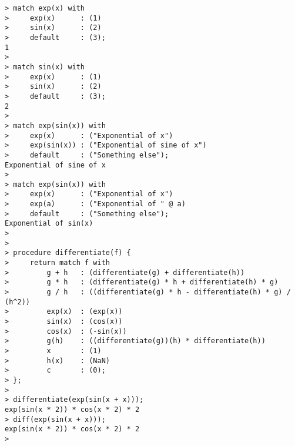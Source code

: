 \begin{center}\begin{minipage}{15cm}\begin{Verbatim}[frame=single]
> match exp(x) with 
>     exp(x)      : (1) 
>     sin(x)      : (2)
>     default     : (3);
1
> 
> match sin(x) with 
>     exp(x)      : (1) 
>     sin(x)      : (2)
>     default     : (3);
2
> 
> match exp(sin(x)) with
>     exp(x)      : ("Exponential of x")
>     exp(sin(x)) : ("Exponential of sine of x")
>     default     : ("Something else");
Exponential of sine of x
> 
> match exp(sin(x)) with
>     exp(x)      : ("Exponential of x")
>     exp(a)      : ("Exponential of " @ a)
>     default     : ("Something else");
Exponential of sin(x)
> 
> 
> procedure differentiate(f) {
>     return match f with 
>         g + h   : (differentiate(g) + differentiate(h))
>         g * h   : (differentiate(g) * h + differentiate(h) * g)
>         g / h   : ((differentiate(g) * h - differentiate(h) * g) / (h^2))
>         exp(x)  : (exp(x))
>         sin(x)  : (cos(x))
>         cos(x)  : (-sin(x))
>         g(h)    : ((differentiate(g))(h) * differentiate(h))
>         x       : (1)
>         h(x)    : (NaN)
>         c       : (0);
> };
> 
> differentiate(exp(sin(x + x)));
exp(sin(x * 2)) * cos(x * 2) * 2
> diff(exp(sin(x + x)));
exp(sin(x * 2)) * cos(x * 2) * 2
> 
\end{Verbatim}
\end{minipage}\end{center}
